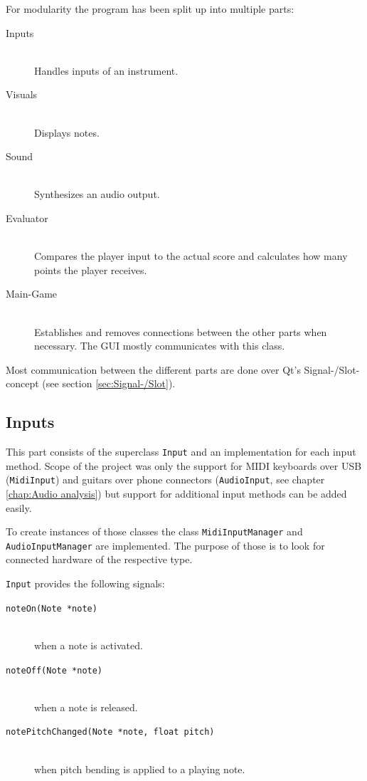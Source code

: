 For modularity the program has been split up into multiple parts:
\begin{description}
	\item[Inputs] \hfil \\ Handles inputs of an instrument.
	\item[Visuals] \hfil \\ Displays notes.
	\item[Sound] \hfil \\ Synthesizes an audio output.
	\item[Evaluator] \hfil \\ Compares the player input to the actual score and calculates how many points the player receives.
	\item[Main-Game] \hfil \\ Establishes and removes connections between the other parts when necessary. The GUI mostly communicates with this class.
\end{description}

Most communication between the different parts are done over Qt's Signal-/Slot-concept (see section \ref{sec:Signal-/Slot}).

\subsection{Inputs}
This part consists of the superclass {\tt Input} and an implementation for each input method. Scope of the project was only the support for MIDI keyboards over USB ({\tt MidiInput}) and guitars over phone connectors ({\tt AudioInput}, see chapter \ref{chap:Audio analysis}) but support for additional input methods can be added easily. 

\begin{sloppypar}
To create instances of those classes the class {\tt MidiInputManager} and {\tt AudioInputManager} are implemented. The purpose of those is to look for connected hardware of the respective type. 
\end{sloppypar}

{\tt Input} provides the following signals:
\begin{description}
	\item[{\tt noteOn(Note *note)}] \hfil \\ when a note is activated.
	\item[{\tt noteOff(Note *note)}] \hfil \\ when a note is released.
	\item[{\tt notePitchChanged(Note *note, float pitch)}] \hfil \\ when pitch bending is applied to a playing note.
\end{description}

